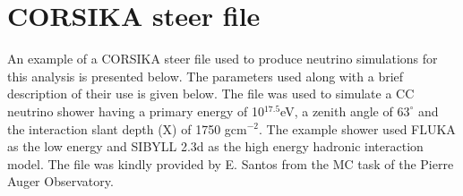 \chapter{CORSIKA steer file}
\label{sec:app_1}
An example of a CORSIKA steer file used to produce neutrino simulations for this analysis is presented below. The parameters used along with a brief description of their use is given below. The file was used to simulate a CC neutrino shower having a primary energy of 10$^{17.5}$eV, a zenith angle of $63^\circ$ and the interaction slant depth (X) of 1750 gcm$^{-2}$. The example shower used FLUKA as the low energy and SIBYLL 2.3d as the high energy hadronic interaction model. The file was kindly provided by E. Santos from the MC task of the Pierre Auger Observatory.

